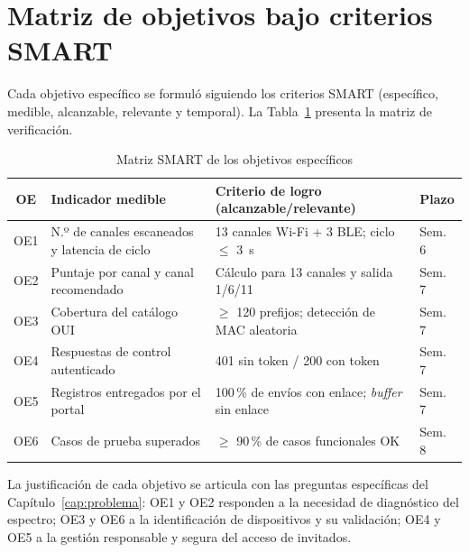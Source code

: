 \section{Matriz de objetivos bajo criterios SMART}
Cada objetivo específico se formuló siguiendo los criterios SMART (específico, medible, alcanzable, relevante y temporal). La Tabla~\ref{tab:smart} presenta la matriz de verificación.

\begin{table}[H]
\centering
\caption{Matriz SMART de los objetivos específicos}
\label{tab:smart}
\footnotesize
\begin{tabularx}{\linewidth}{@{}c X X l@{}}
\toprule
\textbf{OE} & \textbf{Indicador medible} & \textbf{Criterio de logro (alcanzable/relevante)} & \textbf{Plazo} \\
\midrule
OE1 & N.º de canales escaneados y latencia de ciclo & 13 canales Wi-Fi + 3 BLE; ciclo $\le$ 3~s & Sem. 6 \\
OE2 & Puntaje por canal y canal recomendado & Cálculo para 13 canales y salida 1/6/11 & Sem. 7 \\
OE3 & Cobertura del catálogo OUI & $\ge$ 120 prefijos; detección de MAC aleatoria & Sem. 7 \\
OE4 & Respuestas de control autenticado & 401 sin token / 200 con token & Sem. 7 \\
OE5 & Registros entregados por el portal & 100\,\% de envíos con enlace; \emph{buffer} sin enlace & Sem. 7 \\
OE6 & Casos de prueba superados & $\ge$ 90\,\% de casos funcionales OK & Sem. 8 \\
\bottomrule
\end{tabularx}
\end{table}

\noindent La justificación de cada objetivo se articula con las preguntas específicas del Capítulo~\ref{cap:problema}: OE1 y OE2 responden a la necesidad de diagnóstico del espectro; OE3 y OE6 a la identificación de dispositivos y su validación; OE4 y OE5 a la gestión responsable y segura del acceso de invitados.
